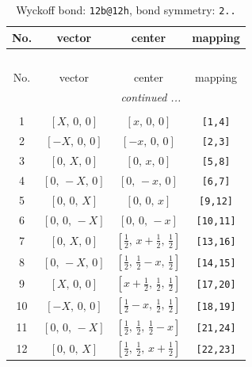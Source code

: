 \documentclass[fleqn,8pt]{jsarticle}
\begin{document}
\renewcommand{\arraystretch}{1.2}
\begin{longtable}{cccc}
\caption{Wyckoff bond: {\tt 12b@12h}, bond symmetry: {\tt 2..}}
 \\
 \hline \hline
No. & vector & center & mapping \\ \hline \endfirsthead

\multicolumn{3}{l}{\tablename\ \thetable{}} \\
 \hline \hline
No. & vector & center & mapping \\ \hline \endhead

 \hline \hline
\multicolumn{3}{r}{\footnotesize\it continued ...} \\ \endfoot

 \hline \hline
\multicolumn{3}{r}{} \\ \endlastfoot

1 & $\left[ X,\, 0,\, 0 \right]$ & $\left[ x,\, 0,\, 0 \right]$ & {\tt [1,4]} \\ \hline
2 & $\left[ - X,\, 0,\, 0 \right]$ & $\left[ - x,\, 0,\, 0 \right]$ & {\tt [2,3]} \\ \hline
3 & $\left[ 0,\, X,\, 0 \right]$ & $\left[ 0,\, x,\, 0 \right]$ & {\tt [5,8]} \\ \hline
4 & $\left[ 0,\, - X,\, 0 \right]$ & $\left[ 0,\, - x,\, 0 \right]$ & {\tt [6,7]} \\ \hline
5 & $\left[ 0,\, 0,\, X \right]$ & $\left[ 0,\, 0,\, x \right]$ & {\tt [9,12]} \\ \hline
6 & $\left[ 0,\, 0,\, - X \right]$ & $\left[ 0,\, 0,\, - x \right]$ & {\tt [10,11]} \\ \hline
7 & $\left[ 0,\, X,\, 0 \right]$ & $\left[ \frac{1}{2},\, x + \frac{1}{2},\, \frac{1}{2} \right]$ & {\tt [13,16]} \\ \hline
8 & $\left[ 0,\, - X,\, 0 \right]$ & $\left[ \frac{1}{2},\, \frac{1}{2} - x,\, \frac{1}{2} \right]$ & {\tt [14,15]} \\ \hline
9 & $\left[ X,\, 0,\, 0 \right]$ & $\left[ x + \frac{1}{2},\, \frac{1}{2},\, \frac{1}{2} \right]$ & {\tt [17,20]} \\ \hline
10 & $\left[ - X,\, 0,\, 0 \right]$ & $\left[ \frac{1}{2} - x,\, \frac{1}{2},\, \frac{1}{2} \right]$ & {\tt [18,19]} \\ \hline
11 & $\left[ 0,\, 0,\, - X \right]$ & $\left[ \frac{1}{2},\, \frac{1}{2},\, \frac{1}{2} - x \right]$ & {\tt [21,24]} \\ \hline
12 & $\left[ 0,\, 0,\, X \right]$ & $\left[ \frac{1}{2},\, \frac{1}{2},\, x + \frac{1}{2} \right]$ & {\tt [22,23]} \\
\end{longtable}
\end{document}
